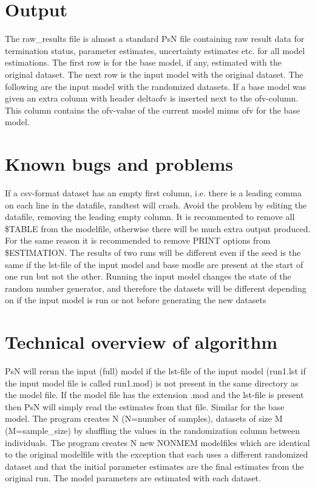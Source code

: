 \section{Output}

The raw\_results file is almost a standard PsN file containing raw result data for termination status, parameter estimates, uncertainty estimates etc. for all model estimations. The first row is for the base model, if any, estimated with the original dataset. The next row is the input model with the original dataset. The following are the input model with the randomized datasets. If a base model was given an extra column with header deltaofv is inserted next to the ofv-column. This column contains the ofv-value of the current model minus ofv for the base model.

\section{Known bugs and problems}

If a csv-format dataset has an empty first column, i.e. there is a leading comma on each line in the datafile, randtest will crash. Avoid the problem by editing the datafile, removing the leading empty column.
It is recommented to remove all \$TABLE from the modelfile, otherwise there will be much extra output produced. For the same reason it is recommended to remove PRINT options from \$ESTIMATION. 
The results of two runs will be different even if the seed is the same if the lst-file of the input model and base modle are present at the start of one run but not the other. Running the input model changes the state of the random number generator, and therefore the datasets will be different depending on if the input model is run or not before generating the  new datasets

\section{Technical overview of algorithm}

PsN will rerun the input (full) model if the lst-file of the input model (run1.lst if the input model file is called run1.mod) is not present in the same directory as the model file. 
If the model file has the extension .mod and the lst-file is present then PsN will simply read the estimates from that file. Similar for the base model.
The program creates N (N=number of samples), datasets of size M (M=sample\_size) by shuffling the values in the randomization column between individuals. The program creates N new NONMEM modelfiles which are identical to the original modelfile with the exception that each uses a different randomized dataset and that the initial parameter estimates are the final estimates from the original run. The model parameters are estimated with each dataset.


